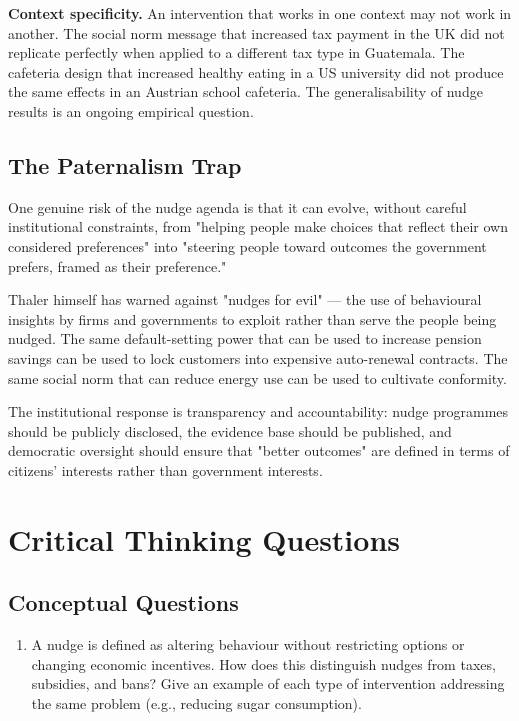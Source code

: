 \documentclass[12pt, letterpaper]{article}
\begin{document}
\textbf{Context specificity.} An intervention that works in one context may not work in another. The social norm message that increased tax payment in the UK did not replicate perfectly when applied to a different tax type in Guatemala. The cafeteria design that increased healthy eating in a US university did not produce the same effects in an Austrian school cafeteria. The generalisability of nudge results is an ongoing empirical question.


\subsection{The Paternalism Trap}


One genuine risk of the nudge agenda is that it can evolve, without careful institutional constraints, from "helping people make choices that reflect their own considered preferences" into "steering people toward outcomes the government prefers, framed as their preference."

Thaler himself has warned against "nudges for evil" --- the use of behavioural insights by firms and governments to exploit rather than serve the people being nudged. The same default-setting power that can be used to increase pension savings can be used to lock customers into expensive auto-renewal contracts. The same social norm that can reduce energy use can be used to cultivate conformity.

The institutional response is transparency and accountability: nudge programmes should be publicly disclosed, the evidence base should be published, and democratic oversight should ensure that "better outcomes" are defined in terms of citizens' interests rather than government interests.

\newpage


\section*{Critical Thinking Questions}



\subsection{Conceptual Questions}


\begin{enumerate}
\item A nudge is defined as altering behaviour without restricting options or changing economic incentives. How does this distinguish nudges from taxes, subsidies, and bans? Give an example of each type of intervention addressing the same problem (e.g., reducing sugar consumption).
\end{enumerate}
\end{document}
